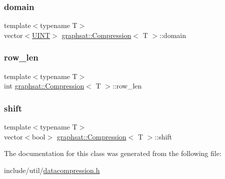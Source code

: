 \mbox{\label{classgraphsat_1_1_compression_adc029dd41948979ddafd6b5e078a8de4}} 
\subsubsection{\texorpdfstring{domain}{domain}}
{\footnotesize\ttfamily template$<$typename T$>$ \\
vector$<$\mbox{\hyperlink{namespacegraphsat_aa3b3d61a8c27ffc03448c5e1f3a76aed}{U\+I\+NT}}$>$ \mbox{\hyperlink{classgraphsat_1_1_compression}{graphsat\+::\+Compression}}$<$ T $>$\+::domain\hspace{0.3cm}{\ttfamily [private]}}

\mbox{\label{classgraphsat_1_1_compression_ab71058988fdbfd50b76c22a77b06958b}} 
\subsubsection{\texorpdfstring{row\_len}{row\_len}}
{\footnotesize\ttfamily template$<$typename T$>$ \\
int \mbox{\hyperlink{classgraphsat_1_1_compression}{graphsat\+::\+Compression}}$<$ T $>$\+::row\+\_\+len\hspace{0.3cm}{\ttfamily [private]}}

\mbox{\label{classgraphsat_1_1_compression_af12d77b61709511dfdf1fe3060ef98b8}} 
\subsubsection{\texorpdfstring{shift}{shift}}
{\footnotesize\ttfamily template$<$typename T$>$ \\
vector$<$bool$>$ \mbox{\hyperlink{classgraphsat_1_1_compression}{graphsat\+::\+Compression}}$<$ T $>$\+::shift\hspace{0.3cm}{\ttfamily [private]}}



The documentation for this class was generated from the following file\+:\begin{DoxyCompactItemize}
\item 
include/util/\mbox{\hyperlink{datacompression_8h}{datacompression.\+h}}\end{DoxyCompactItemize}

